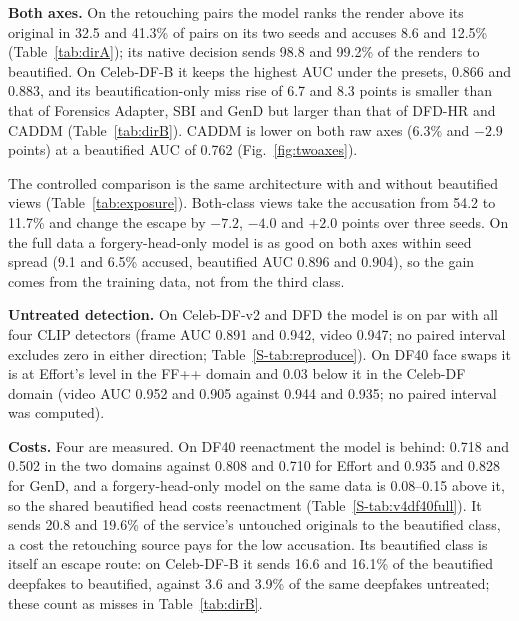 \documentclass[conference]{IEEEtran}
\begin{document}
\textbf{Both axes.} On the retouching pairs the model ranks the render above its original in 32.5 and 41.3\% of pairs on
its two seeds and accuses 8.6 and 12.5\% (Table~\ref{tab:dirA}); its native decision sends 98.8 and 99.2\% of the renders to
beautified. On Celeb-DF-B it keeps the highest AUC under the presets, 0.866 and 0.883, and its beautification-only miss rise
of 6.7 and 8.3 points is smaller than that of Forensics Adapter, SBI and GenD but larger than that of DFD-HR and CADDM
(Table~\ref{tab:dirB}). CADDM is lower on both raw axes (6.3\% and $-2.9$ points) at a beautified AUC of 0.762
(Fig.~\ref{fig:twoaxes}).

The controlled comparison is the same architecture with and without
beautified views (Table~\ref{tab:exposure}). Both-class views take the accusation from 54.2 to 11.7\% and change the escape by
$-7.2$, $-4.0$ and $+2.0$ points over three seeds. On the full data a forgery-head-only model is as good on both axes
within seed spread (9.1 and 6.5\% accused, beautified AUC 0.896 and 0.904), so the gain comes from the training data, not
from the third class.

\textbf{Untreated detection.} On Celeb-DF-v2 and DFD the model is on par with all four CLIP detectors (frame AUC 0.891 and
0.942, video 0.947; no paired interval excludes zero in either direction; Table~\ref{S-tab:reproduce}).
On DF40 face swaps it is at Effort's level in the FF++ domain and
0.03 below it in the Celeb-DF domain (video AUC 0.952 and 0.905 against 0.944 and 0.935; no paired interval was computed).

\textbf{Costs.} Four are measured. On DF40 reenactment the model is behind: 0.718 and 0.502 in the two domains against
0.808 and 0.710 for Effort and 0.935 and 0.828 for GenD, and a forgery-head-only model on the same data is 0.08--0.15 above
it, so the shared beautified head costs reenactment (Table~\ref{S-tab:v4df40full}).
It sends 20.8 and 19.6\% of the service's untouched originals to the beautified class,
a cost the retouching source pays for the low accusation. Its beautified class is itself an escape route: on Celeb-DF-B it
sends 16.6 and 16.1\% of the beautified deepfakes to beautified, against 3.6 and 3.9\% of the same deepfakes untreated; these
count as misses in Table~\ref{tab:dirB}.
\end{document}
